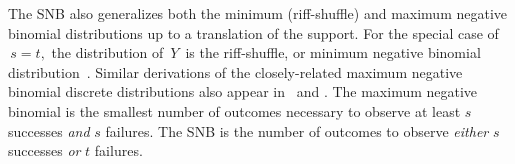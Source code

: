 \documentclass[review]{elsarticle}
\begin{document}
The SNB also generalizes both the minimum (riff-shuffle) and maximum negative
binomial distributions up to a translation of the support.
For the special case of $\,s=t,$ the distribution of $\,Y\,$ is the
riff-shuffle, or minimum negative binomial distribution~\citep{Uppuluri1970}.
Similar derivations of the closely-related maximum negative binomial 
discrete distributions also appear in~\cite{Zhang2000}
and \cite{Zelterman2005}.
The maximum negative binomial is the smallest number of outcomes necessary to 
observe at least $s$ successes {\em and} $s$ failures. The SNB is the 
number of outcomes to observe {\em either} $s$ successes {\em or} $t$ failures.

\end{document}
